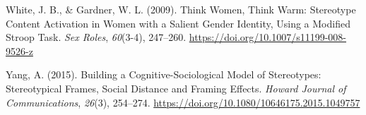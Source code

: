 \documentclass[
  12pt,
  letterpaper,
  DIV=11,
  numbers=noendperiod]{scrartcl}
\newlength{\cslhangindent}
\newlength{\cslentryspacingunit} %
\newenvironment{CSLReferences}[2] %
 {%
  \setlength{\parindent}{0pt}
  \ifodd #1
  \let\oldpar\par
  \def\par{\hangindent=\cslhangindent\oldpar}
  \fi
  \setlength{\parskip}{#2\cslentryspacingunit}
 }%
 {}
\begin{document}
\begin{CSLReferences}{1}{0}
\leavevmode{}%
White, J. B., \& Gardner, W. L. (2009). Think {Women}, {Think Warm}:
{Stereotype Content Activation} in {Women} with a {Salient Gender
Identity}, {Using} a {Modified Stroop Task}. \emph{Sex Roles},
\emph{60}(3-4), 247--260.
\url{https://doi.org/10.1007/s11199-008-9526-z}

\leavevmode{}%
Yang, A. (2015). Building a {Cognitive-Sociological Model} of
{Stereotypes}: {Stereotypical Frames}, {Social Distance} and {Framing
Effects}. \emph{Howard Journal of Communications}, \emph{26}(3),
254--274. \url{https://doi.org/10.1080/10646175.2015.1049757}

\end{CSLReferences}
\end{document}

